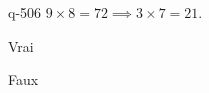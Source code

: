 \begin{truefalse}{q-506}
$9\times 8 = 72 \implies 3\times 7 = 21$.
\item* Vrai
\item Faux
\end{truefalse}

